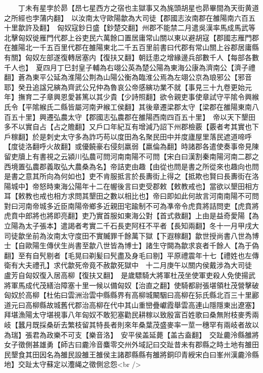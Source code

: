 　　丁未有星孛於昴【昂七星西方之宿也主獄事又為旄頭胡星也昴畢間為天街黄道之所經也孛蒲内翻】　以汝南太守歐陽歙為大司徒【郡國志汝南郡在雒陽南六百五十里歙許及翻】　匈奴寇鈔日盛【鈔楚交翻】州郡不能禁二月遣吳漢率馬成馬武等北擊匈奴徙雁門代郡上谷吏民六萬餘口置居庸常山關以東以避胡寇【郡國志雁門郡在雒陽北一千五百里代郡在雒陽東北二千五百里前書曰代郡有常山關上谷郡居庸縣有關】匈奴左部遂復轉居塞内【復扶又翻】朝廷患之增緣邊兵部數千人【每部各數千人也】　夏四月丁巳封皇子輔為右翊公英為楚公陽為東海公康為濟南公【濟子禮翻】蒼為東平公延為淮陽公荆為山陽公衡為臨淮公焉為左翊公京為琅邪公【邪音耶】癸丑追諡兄縯為齊武公兄仲為魯哀公帝感縯功業不就【事見三十九卷更始元年】撫育二子章興恩愛甚篤以其少貴【少詩照翻】欲令親吏事使章試守平隂令興緱氏令【平隂緱氏二縣皆屬河南尹緱工侯翻】其後章遷梁郡太守【梁郡在雒陽東南八百五十里】興遷弘農太守【郡國志弘農郡在雒陽西南四百五十里】　帝以天下墾田多不以實自占【占之贍翻】又戶口年紀互有增減乃詔下州郡檢覈【覈者考其實也下戶稼翻】於是刺史太守多為詐巧苟以度田為名聚民田中并度廬屋里落民遮道啼呼【度徒洛翻呼火故翻】或優饒豪右侵刻羸弱【羸倫為翻】時諸郡各遣使奏事帝見陳留吏牘上有書視之云潁川弘農可問河南南陽不可問【宋白曰漢割秦南陽河南二郡之西境置弘農郡義取弘大農桑為名】帝詰吏由趣【由從也問是書之所從來也趣向也問是書之意其所向為何如也】吏不肯服抵言於長夀街上得之【抵欺也賢曰長夀街在洛陽城中】帝怒時東海公陽年十二在幄後言曰吏受郡敕【敕教戒也】當欲以墾田相方耳【敕教也戒也相方求問其墾田之數以相比也】帝曰即如此何故言河南南陽不可問對曰河南帝城多近臣南陽帝鄉多近親田宅踰制不可為凖帝令虎賁將詰問吏【虎賁將虎賁中郎將也將即亮翻】吏乃實首服如東海公對【首式救翻】上由是益奇愛陽【為立陽為太子張本】遣謁者考實二千石長吏阿枉不平者【長知兩翻】冬十一月甲戌大司徒歙坐前為汝南太守度田不實贓罪千餘萬下獄【下遐稼翻】歙世授尚書八世為博士【自歐陽生傳伏生尚書至歙八世皆為博士】諸生守闕為歙求哀者千餘人【為于偽翻】至有自髠剔者【毛晃曰剃髪曰髠盡及身毛曰剔】平原禮震年十七【禮姓也左傳衛有大夫禮孔】求代歙死帝竟不赦歙死獄中　十二月庚午以關内侯戴涉為大司徒　盧芳自匈奴復入居高柳【復扶又翻】　是歲驃騎大將軍杜茂坐使軍吏殺人免使揚武將軍馬成代茂繕治障塞十里一候以備匈奴【治直之翻】使騎都尉張堪領杜茂營擊破匈奴於高柳【杜佑曰雲洲治雲中縣縣界有高柳城闞駰曰高柳在狋氏縣北百三十里酈道元曰高柳縣故城舊代郡治高柳在代中其山重巒疊巘霞舉雲高連山隱隱東出遼塞】拜堪漁陽太守堪視事八年匈奴不敢犯塞勸民耕稼以致殷富百姓歌曰桑無附枝麥秀兩岐【蠶月既採桑斫去繁枝留其特長者則來年桑葉茂盛麥率一莖一穗罕有兩岐者故以為瑞】張君為政樂不可支【樂音洛】　安平侯盖延薨【盖古盍翻】　交趾麊泠縣雒將女子徵側甚雄勇【師古曰麊泠音麋零交州外域記曰交趾昔未有郡縣之時土地有雒田民墾食其田因名為雒民設雒王雒侯主諸郡縣縣有雒將銅印青綬宋白曰峯州漢麊泠縣地】交趾太守蘇定以灋䋲之徵側忿怨<br />
